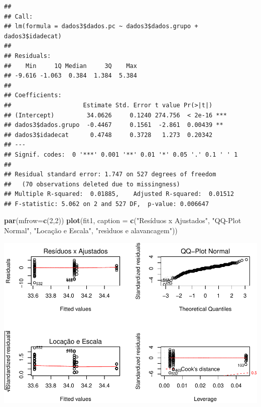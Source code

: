 \documentclass[11pt,]{article}
\makeatletter
\newenvironment{Shaded}{\begin{snugshade}}{\end{snugshade}}
\newcommand{\KeywordTok}[1]{\textcolor[rgb]{0.13,0.29,0.53}{\textbf{{#1}}}}
\newcommand{\DataTypeTok}[1]{\textcolor[rgb]{0.13,0.29,0.53}{{#1}}}
\newcommand{\DecValTok}[1]{\textcolor[rgb]{0.00,0.00,0.81}{{#1}}}
\newcommand{\StringTok}[1]{\textcolor[rgb]{0.31,0.60,0.02}{{#1}}}
\newcommand{\NormalTok}[1]{{#1}}
\def\maxwidth{\ifdim\Gin@nat@width>\linewidth\linewidth
\else\Gin@nat@width\fi}
\let\Oldincludegraphics\includegraphics
\renewcommand{\includegraphics}[1]{\Oldincludegraphics[width=\maxwidth]{#1}}
\makeatother
\begin{document}
\begin{Shaded}
\end{Shaded}

\begin{verbatim}
## 
## Call:
## lm(formula = dados3$dados.pc ~ dados3$dados.grupo + dados3$idadecat)
## 
## Residuals:
##    Min     1Q Median     3Q    Max 
## -9.616 -1.063  0.384  1.384  5.384 
## 
## Coefficients:
##                    Estimate Std. Error t value Pr(>|t|)    
## (Intercept)         34.0626     0.1240 274.756  < 2e-16 ***
## dados3$dados.grupo  -0.4467     0.1561  -2.861  0.00439 ** 
## dados3$idadecat      0.4748     0.3728   1.273  0.20342    
## ---
## Signif. codes:  0 '***' 0.001 '**' 0.01 '*' 0.05 '.' 0.1 ' ' 1
## 
## Residual standard error: 1.747 on 527 degrees of freedom
##   (70 observations deleted due to missingness)
## Multiple R-squared:  0.01885,    Adjusted R-squared:  0.01512 
## F-statistic: 5.062 on 2 and 527 DF,  p-value: 0.006647
\end{verbatim}

\begin{Shaded}
\begin{Highlighting}[]
\KeywordTok{par}\NormalTok{(}\DataTypeTok{mfrow=}\KeywordTok{c}\NormalTok{(}\DecValTok{2}\NormalTok{,}\DecValTok{2}\NormalTok{))}
\KeywordTok{plot}\NormalTok{(fit1, }\DataTypeTok{caption =} \KeywordTok{c}\NormalTok{(}\StringTok{"Resíduos x Ajustados"}\NormalTok{, }\StringTok{"QQ-Plot Normal"}\NormalTok{,}
                       \StringTok{"Locação e Escala"}\NormalTok{, }\StringTok{"resìduos e alavancagem"}\NormalTok{))}
\end{Highlighting}
\end{Shaded}

\includegraphics{versaofinal_lista3_files/figure-latex/unnamed-chunk-14-1.pdf}
\end{document}
